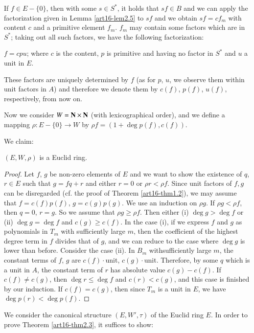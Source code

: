 If $f \in E - \{0\}$, then with some $s\in S^*$, it holds that $sf \in B$ and we can apply the factorization given in Lemma \ref{art16-lem2.5} to $sf$ and we obtain $sf = cf_m$ with content  $c$ and a primitive element $f_m$.  $f_m$ may contain some factors which are in $S^*$; taking out all such factors, we have the following factorization:

$f = cpu$; where $c$ is the content, $p$ is primitive and having no factor in $S^*$ and $u$ a unit in $E$.

These factors are uniquely determined by $f$ (as for $p$, $u$, we observe them within unit factors in $A$) and therefore we denote them by $c(f)$, $p(f)$, $u(f)$, respectively, from now on.

Now we consider $W = \mathbf{N} \times \mathbf{N}$ (with lexicographical order), and we define a mapping $\rho: E  - \{0\} \to W$ by $\rho f = (1 + \deg p (f), c (f))$.

We claim:

\begin{lemma}\label{art16-lem2.7}
$(E, W, \rho)$ is a Euclid ring.
\end{lemma}

\begin{proof}
Let $f$, $g$ be non-zero elements of $E$ and we want to show the existence of $q$, $r \in E$ such that $g = fq+r$ and either $r =0$ or $\rho r < \rho f$. Since unit factors of $f, g$ can be disregarded (cf. the proof of Theorem \ref{art16-thm1.2}), we may assume that $f = c(f) p(f)$, $g = c(g) p (g)$. We use an induction on $\rho g$. If $\rho g < \rho f$, then $q = 0$, $r = g$. So we assume that $\rho g \geqslant \rho f$. Then either (i) $\deg g > \deg f$ or (ii) $\deg g = \deg f$ and $c(g) \geqslant c(f)$. In the case (i), if we express $f$ and $g$ as polynomials in $T_m$ with sufficiently large $m$, then the coefficient of the highest degree term in $f$ divides that of $g$, and we can reduce to the case where $\deg g$ is lower than before. Consider the case (ii). In $B_m$ with\pageoriginale sufficiently large $m$, the constant terms of $f$, $g$ are $c(f) \cdot$unit, $c(g)\cdot$unit. Therefore, by some $q$ which is a unit in $A$, the constant term of $r$ has absolute value $c(g) - c(f)$. If $c(f)\neq c (g)$, then $\deg r \leqslant \deg f$ and $c(r) < c(g)$, and this case is finished by our induction. If $c(f) = c(g)$, then since $T_m$ is a unit in $E$, we have $\deg p(r) < \deg p(f)$. 
\end{proof}

We consider the canonical structure $(E, W',\tau)$ of the Euclid ring $E$. In order to prove Theorem \ref{art16-thm2.3}, it suffices to show:

